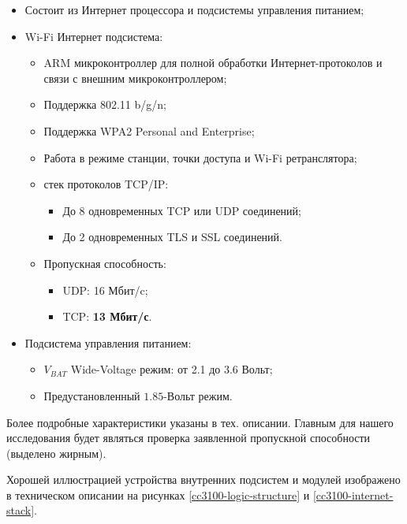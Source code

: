 \begin{itemize}
    \item Состоит из Интернет процессора и подсистемы управления питанием;
    \item Wi-Fi Интернет подсистема:
        \begin{itemize}[$\star$]
            \item ARM микроконтроллер для полной обработки Интернет-протоколов и
            связи с внешним микроконтроллером;
            \item Поддержка 802.11 b/g/n;
            \item Поддержка WPA2 Personal and Enterprise;
            \item Работа в режиме станции, точки доступа и Wi-Fi ретранслятора;
            \item стек протоколов TCP/IP:
            \begin{itemize}
                \item До 8 одновременных TCP или UDP соединений;
                \item До 2 одновременных TLS и SSL соединений.
            \end{itemize}
            \item Пропускная способность:
            \begin{itemize}
                \item UDP: 16 Мбит/c;
                \item TCP: \textbf{13 Мбит/с}.
            \end{itemize}
        \end{itemize}
    \item Подсистема управления питанием:
    \begin{itemize}[$\star$]
        \item $V_{BAT}$ Wide-Voltage режим: от 2.1 до 3.6 Вольт;
        \item Предустановленный $1.85$-Вольт режим.
    \end{itemize}
\end{itemize}

Более подробные характеристики указаны в тех. описании\cite{cc3100datasheet}.
Главным для нашего исследования будет являться проверка заявленной
пропускной способности (выделено жирным).

Хорошей иллюстрацией устройства внутренних подсистем и модулей
изображено в техническом описании на рисунках \ref{cc3100-logic-structure} и
\ref{cc3100-internet-stack}.
\clearpage

